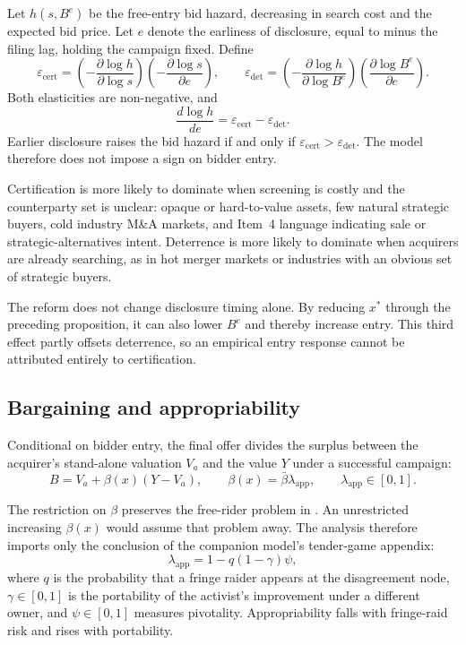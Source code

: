 Let $h(s,B^e)$ be the free-entry bid hazard, decreasing in search cost and the
expected bid price. Let $e$ denote the earliness of disclosure, equal to minus
the filing lag, holding the campaign fixed. Define
\[
\varepsilon_{\mathrm{cert}}
=\left(-\frac{\partial\log h}{\partial\log s}\right)
 \left(-\frac{\partial\log s}{\partial e}\right),
\qquad
\varepsilon_{\mathrm{det}}
=\left(-\frac{\partial\log h}{\partial\log B^e}\right)
 \left(\frac{\partial\log B^e}{\partial e}\right).
\]
Both elasticities are non-negative, and
\begin{equation}
\frac{d\log h}{de}
=\varepsilon_{\mathrm{cert}}-\varepsilon_{\mathrm{det}}.
\label{eq:entry-elasticity}
\end{equation}
Earlier disclosure raises the bid hazard if and only if
$\varepsilon_{\mathrm{cert}}>\varepsilon_{\mathrm{det}}$. The model therefore
does not impose a sign on bidder entry.

Certification is more likely to dominate when screening is costly and the
counterparty set is unclear: opaque or hard-to-value assets, few natural
strategic buyers, cold industry M\&A markets, and Item~4 language indicating
sale or strategic-alternatives intent. Deterrence is more likely to dominate
when acquirers are already searching, as in hot merger markets or industries
with an obvious set of strategic buyers.

The reform does not change disclosure timing alone. By reducing $x^\ast$
through the preceding proposition, it can also lower $B^e$ and thereby increase
entry. This third effect partly offsets deterrence, so an empirical entry
response cannot be attributed entirely to certification.

\subsection{Bargaining and appropriability}
\label{sec:model-bargain}

Conditional on bidder entry, the final offer divides the surplus between the
acquirer's stand-alone valuation $V_a$ and the value $Y$ under a successful
campaign:
\begin{equation}
B=V_a+\beta(x)(Y-V_a),
\qquad
\beta(x)=\bar{\beta}\lambda_{\mathrm{app}},
\qquad
\lambda_{\mathrm{app}}\in[0,1].
\label{eq:bargain}
\end{equation}

The restriction on $\beta$ preserves the free-rider problem in
\textcite{grossmanhart1980freerider}. An unrestricted increasing $\beta(x)$
would assume that problem away. The analysis therefore imports only the
conclusion of the companion model's tender-game appendix:
\[
\lambda_{\mathrm{app}}=1-q(1-\gamma)\psi,
\]
where $q$ is the probability that a fringe raider appears at the disagreement
node, $\gamma\in[0,1]$ is the portability of the activist's improvement under a
different owner, and $\psi\in[0,1]$ measures pivotality. Appropriability falls
with fringe-raid risk and rises with portability.

